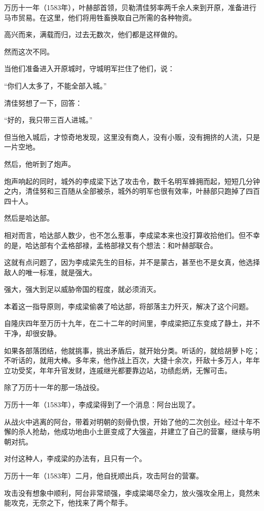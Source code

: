 \begin{multicols}{\theparacolNo}
		万历十一年（1583年），叶赫部首领，贝勒清佳努率两千余人来到开原，准备进行马市贸易。在这里，他们将用牲畜换取自己所需的各种物资。

		高兴而来，满载而归，过去无数次，他们都是这样做的。

		然而这次不同。

		当他们准备进入开原城时，守城明军拦住了他们，说：

		“你们人太多了，不能全部入城。”

		清佳努想了一下，回答：

		“好的，我只带三百人进城。”

		但当他入城后，才惊奇地发现，这里没有商人，没有小贩，没有拥挤的人流，只是一片空地。

		然后，他听到了炮声。

		炮声响起的同时，城外的李成梁下达了攻击令，数千名明军蜂拥而起，短短几分钟之内，清佳努和三百随从全部被杀，城外的明军也很有效率，叶赫部只跑掉了四百四十人。

		然后是哈达部。

		相对而言，哈达部人数少，也不怎么惹事，李成梁本来也没打算收拾他们。但不幸的是，哈达部有个孟格部禄，孟格部禄又有个想法：和叶赫部联合。

		这就有点问题了，因为李成梁先生的目标，并不是蒙古，甚至也不是女真，他选择敌人的唯一标准，就是强大。

		强大，强大到足以威胁帝国的程度，就必须消灭。

		本着这一指导原则，李成梁偷袭了哈达部，将部落主力歼灭，解决了这个问题。

		自隆庆四年至万历十九年，在二十二年的时间里，李成梁把辽东变成了静土，并不干净，却很安静。

		如果各部落团结，他就挑事，挑出矛盾后，就开始分类。听话的，就给胡萝卜吃；不听话的，就用大棒。多年来，他作战上百次，大捷十余次，歼敌十多万人，年年立功受奖，年年升官发财，连戚继光都要靠边站，功绩彪炳，无懈可击。

		除了万历十一年的那一场战役。

		万历十一年（1583年），李成梁得到了一个消息：阿台出现了。

		从战火中逃离的阿台，带着对明朝的刻骨仇恨，开始了他的二次创业。经过十年不懈的杀人抢劫，他成功地由小土匪变成了大强盗，并建立了自己的营寨，继续与明朝对抗。

		对付这种人，李成梁的办法有，且只有一个。

		万历十一年（1583年）二月，他自抚顺出兵，攻击阿台的营寨。

		攻击没有想象中顺利，阿台非常顽强，李成梁竭尽全力，放火强攻全用上，竟然未能攻克，无奈之下，他找来了两个帮手。


\end{multicols}
